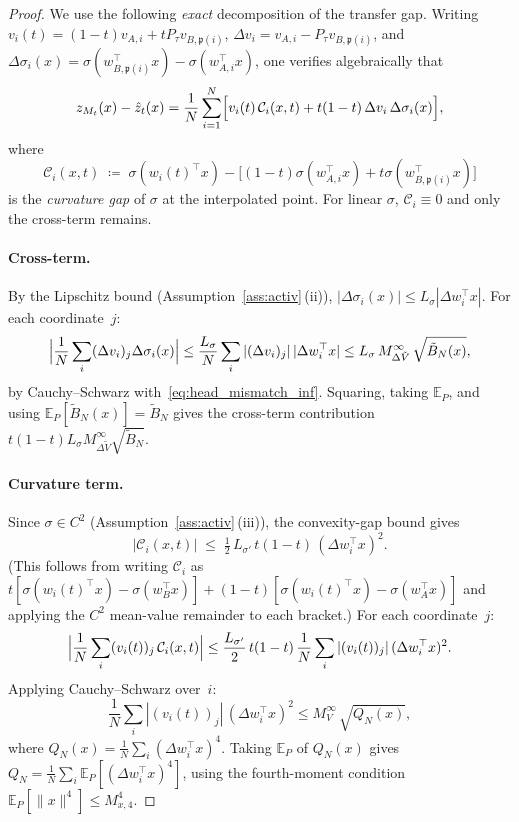 \documentclass[11pt]{article}
\newcommand{\E}{\mathbb{E}}
\newcommand{\nperm}{\mathfrak{p}}  %
\begin{document}
\begin{proof}
We use the following \emph{exact} decomposition of the transfer gap.
Writing $v_i(t) = (1-t)v_{A,i} + tP_\tau v_{B,\nperm(i)}$,
$\Delta v_i = v_{A,i} - P_\tau v_{B,\nperm(i)}$,
and $\Delta\sigma_i(x) = \sigma(w_{B,\nperm(i)}^\top x)
- \sigma(w_{A,i}^\top x)$, one verifies algebraically that
\begin{equation}\label{eq:exact_decomp}
  z_{M_t}(x) - \hat z_t(x)
  = \frac{1}{N}\sum_{i=1}^N \Bigl[
    v_i(t)\,\mathcal{C}_i(x,t)
    + t(1-t)\,\Delta v_i\,\Delta\sigma_i(x)
  \Bigr],
\end{equation}
where
\[
  \mathcal{C}_i(x,t) \;\coloneqq\;
  \sigma(w_i(t)^\top x)
  - \bigl[(1-t)\sigma(w_{A,i}^\top x) + t\sigma(w_{B,\nperm(i)}^\top x)\bigr]
\]
is the \emph{curvature gap} of $\sigma$ at the interpolated point.
For linear $\sigma$, $\mathcal{C}_i \equiv 0$ and only the cross-term remains.

\paragraph{Cross-term.}
By the Lipschitz bound (Assumption~\ref{ass:activ}\,(ii)),
$|\Delta\sigma_i(x)| \le L_\sigma |\Delta w_i^\top x|$.
For each coordinate~$j$:
\[
  \Bigl|\frac{1}{N}\sum_i (\Delta v_i)_j \Delta\sigma_i(x)\Bigr|
  \le \frac{L_\sigma}{N}\sum_i |(\Delta v_i)_j|\,|\Delta w_i^\top x|
  \le L_\sigma\,M_{\Delta \tilde V}^\infty\,\sqrt{\tilde B_N(x)},
\]
by Cauchy--Schwarz with~\eqref{eq:head_mismatch_inf}.
Squaring, taking $\E_P$, and using $\E_P[\tilde B_N(x)] = \tilde B_N$
gives the cross-term contribution
$t(1-t) L_\sigma M_{\Delta \tilde V}^\infty \sqrt{\tilde B_N}$.

\paragraph{Curvature term.}
Since $\sigma \in C^2$ (Assumption~\ref{ass:activ}\,(iii)),
the convexity-gap bound gives
\[
  |\mathcal{C}_i(x,t)|
  \;\le\; \tfrac{1}{2}\,L_{\sigma'}\,t(1-t)\,(\Delta w_i^\top x)^2.
\]
(This follows from writing $\mathcal{C}_i$ as
$t[\sigma(w_i(t)^\top x) - \sigma(w_{B}^\top x)]
+ (1-t)[\sigma(w_i(t)^\top x) - \sigma(w_{A}^\top x)]$
and applying the $C^2$ mean-value remainder to each bracket.)
For each coordinate~$j$:
\[
  \Bigl|\frac{1}{N}\sum_i (v_i(t))_j\,\mathcal{C}_i(x,t)\Bigr|
  \le \frac{L_{\sigma'}}{2}\,t(1-t)\,
  \frac{1}{N}\sum_i |(v_i(t))_j|\,(\Delta w_i^\top x)^2.
\]
Applying Cauchy--Schwarz over~$i$:
\[
  \frac{1}{N}\sum_i |(v_i(t))_j|\,(\Delta w_i^\top x)^2
  \le M_V^\infty\,\sqrt{Q_N(x)},
\]
where
$Q_N(x) = \frac{1}{N}\sum_i (\Delta w_i^\top x)^4$.
Taking $\E_P$ of $Q_N(x)$ gives
$Q_N = \frac{1}{N}\sum_i \E_P[(\Delta w_i^\top x)^4]$,
using the fourth-moment condition $\E_P[\|x\|^4] \le M_{x,4}^4$.


\end{proof}
\end{document}
